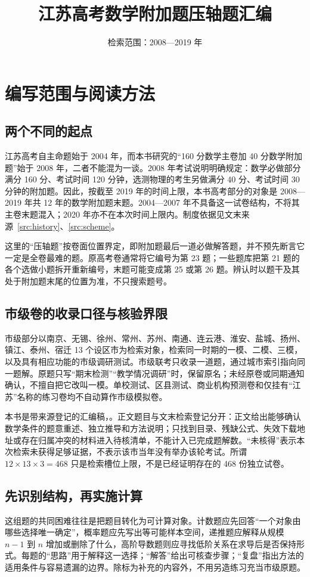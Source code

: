 \documentclass[UTF8]{ctexart}
\title{江苏高考数学附加题压轴题汇编}
\author{}
\date{检索范围：2008—2019 年}
\begin{document}
\maketitle
\tableofcontents

\section{编写范围与阅读方法}\label{sec:intro}
\subsection{两个不同的起点}
江苏高考自主命题始于 2004 年，而本书研究的“160 分数学主卷加 40 分数学附加题”始于 2008 年，二者不能混为一谈。2008 年考试说明明确规定：数学必做部分满分 160 分、考试时间 120 分钟，选测物理的考生另做满分 40 分、考试时间 30 分钟的附加题。因此，按截至 2019 年的时间上限，本书高考部分的对象是 2008—2019 年共 12 年的数学附加题末题。2004—2007 年不具备这一试卷结构，不将其主卷末题混入；2020 年亦不在本次时间上限内。制度依据见文末来源~\ref{src:history}、\ref{src:scheme}。

这里的“压轴题”按卷面位置界定，即附加题最后一道必做解答题，并不预先断言它一定是全卷最难的题。原高考卷通常将它编号为第 23 题；一些题库把第 21 题的各个选做小题拆开重新编号，末题可能变成第 25 或第 26 题。辨认时以题干及其处于附加题末尾的位置为准，不只搜索题号。

\subsection{市级卷的收录口径与核验界限}
市级部分以南京、无锡、徐州、常州、苏州、南通、连云港、淮安、盐城、扬州、镇江、泰州、宿迁 13 个设区市为检索对象，检索同一时期的一模、二模、三模，以及具有相应功能的市级调研测试。市级联考只收录一道题，通过城市索引指向同一题解。原题只写“期末检测”“教学情况调研”时，保留原名；未经原卷或同期通知确认，不擅自把它改叫一模。单校测试、区县测试、商业机构预测卷和仅挂有“江苏”名称的练习卷均不自动算作市级模拟卷。

本书是带来源登记的汇编稿，。正文题目与文末检索登记分开：正文给出能够确认数学条件的题意重述、独立推导和方法说明；只找到目录、残缺公式、失效下载地址或存在归属冲突的材料进入待核清单，不能计入已完成题解数。“未核得”表示本次检索未获得足够证据，不表示该市当年没有举办该轮考试。所谓 $12\times13\times3=468$ 只是检索槽位上限，不是已经证明存在的 468 份独立试卷。

\subsection{先识别结构，再实施计算}
这组题的共同困难往往是把题目转化为可计算对象。计数题应先回答“一个对象由哪些选择唯一确定”，概率题应先写出等可能样本空间，递推题应解释从规模 $n-1$ 到 $n$ 增加或删除了什么，高阶导数题则应寻找低阶关系在求导后是否保持形式。每题的“思路”用于解释这一选择；“解答”给出可核查步骤；“复盘”指出方法的适用条件与容易遗漏的边界。除标为补充的内容外，不用另造练习充当市级原题。
\end{document}
